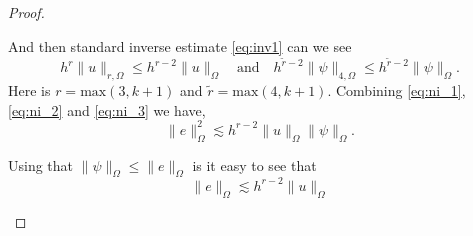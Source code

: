 \begin{proof}
\begin{enumerate}[label=\arabic*)]
        And then standard inverse estimate \eqref{eq:inv1} can we see
        \begin{equation}
            \label{eq:ni_3}
             h^{r} \| u \|_{r,\Omega  }^{  }  \le h^{r-2} \| u \|_{\Omega  }^{  } \quad  \text{and}\quad  h^{\widetilde{r} -2} \| \psi  \|_{4,\Omega  }^{  }  \le h^{\widetilde{r}-2} \| \psi  \|_{\Omega }^{  }.
        \end{equation}
        Here is $r = \mathrm{max}(3,k+1)$ and $ \widetilde{r} = \mathrm{max}(4,k+1)$.
        Combining \eqref{eq:ni_1}, \eqref{eq:ni_2} and \eqref{eq:ni_3} we have, \begin{equation}
            \| e \|_{\Omega   }^{ 2 } \lesssim  h^{r-2} \| u \|_{\Omega   }^{  } \|  \psi \|_{ \Omega  }^{  }.
        \end{equation}

        Using that $\| \psi  \|_{ \Omega  }^{  } \le \| e \|_{ \Omega   }^{  }  $ is it easy to see that \begin{equation}
            \| e \|_{\Omega   }^{  } \lesssim  h^{r-2} \| u \|_{\Omega   }^{  }
        \end{equation}

    \end{enumerate}
\end{proof}


